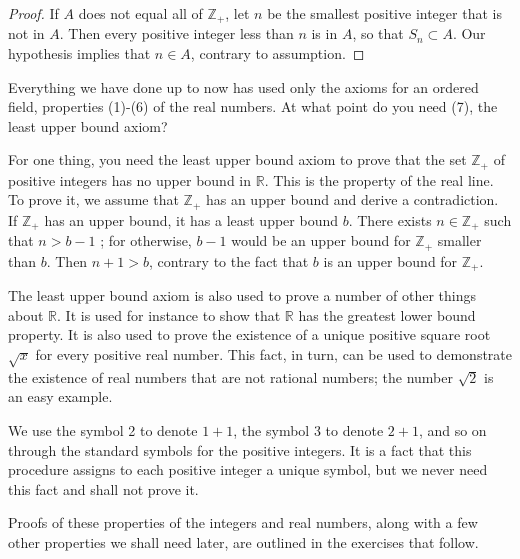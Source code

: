 \begin{proof}
 If \(A\) does not equal all of \(\mathbb{Z}_{+}\), let \(n\) be the smallest positive integer that is not in \(A\). Then every positive integer less than \(n\) is in \(A\), so that \(S_{n} \subset A\). Our hypothesis implies that \(n \in A\), contrary to assumption.
\end{proof}

Everything we have done up to now has used only the axioms for an ordered field, 
properties (1)-(6) of the real numbers. At what point do you need (7), 
the least upper bound axiom?

For one thing, you need the least upper bound axiom to prove that the set 
\(\mathbb{Z}_{+}\) of positive integers has no upper bound in \(\mathbb{R}\). 
This is the  property of the real line. To prove it, 
we assume that \(\mathbb{Z}_{+}\) has an upper bound and derive a contradiction. 
If \(\mathbb{Z}_{+}\) has an upper bound, it has a least upper bound \(b\). 
There exists \(n \in {\mathbb{Z}}_{+}\) such that \(n > b - 1\) ; for otherwise, 
\(b - 1\) would be an upper bound for \(\mathbb{Z}_{+}\) smaller than \(b\). 
Then \(n + 1 > b\), contrary to the fact that \(b\) is an upper bound for \(\mathbb{Z}_{+}\).

The least upper bound axiom is also used to prove a number of other things about \(\mathbb{R}\). 
It is used for instance to show that \(\mathbb{R}\) has the greatest lower bound property. 
It is also used to prove the existence of a unique positive square root \(\sqrt{x}\) for every 
positive real number. This fact, in turn, can be used to demonstrate the existence of 
real numbers that are not rational numbers; the number \(\sqrt{2}\) is an easy example.

We use the symbol 2 to denote \(1 + 1\), the symbol 3 to denote \(2 + 1\), 
and so on through the standard symbols for the positive integers. 
It is a fact that this procedure assigns to each positive integer a unique symbol, 
but we never need this fact and shall not prove it.

Proofs of these properties of the integers and real numbers, 
along with a few other properties we shall need later, 
are outlined in the exercises that follow.

